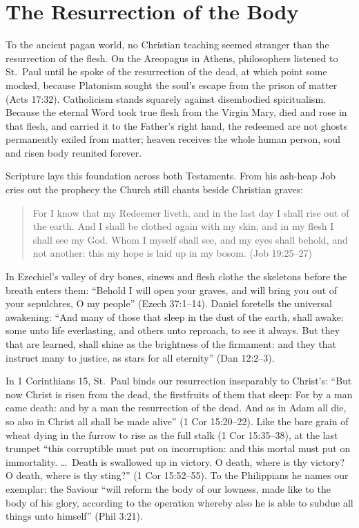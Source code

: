 \section{The Resurrection of the Body}

To the ancient pagan world, no Christian teaching seemed stranger than the resurrection of the flesh. On the Areopagus in Athens, philosophers listened to St.\ Paul until he spoke of the resurrection of the dead, at which point some mocked, because Platonism sought the soul's escape from the prison of matter (Acts 17:32). Catholicism stands squarely against disembodied spiritualism. Because the eternal Word took true flesh from the Virgin Mary, died and rose in that flesh, and carried it to the Father's right hand, the redeemed are not ghosts permanently exiled from matter; heaven receives the whole human person, soul and risen body reunited forever.

Scripture lays this foundation across both Testaments. From his ash-heap Job cries out the prophecy the Church still chants beside Christian graves:

\begin{quote}
For I know that my Redeemer liveth, and in the last day I shall rise out of the earth. And I shall be clothed again with my skin, and in my flesh I shall see my God. Whom I myself shall see, and my eyes shall behold, and not another: this my hope is laid up in my bosom. (Job 19:25--27)
\end{quote}

In Ezechiel's valley of dry bones, sinews and flesh clothe the skeletons before the breath enters them: ``Behold I will open your graves, and will bring you out of your sepulchres, O my people'' (Ezech 37:1--14). Daniel foretells the universal awakening: ``And many of those that sleep in the dust of the earth, shall awake: some unto life everlasting, and others unto reproach, to see it always. But they that are learned, shall shine as the brightness of the firmament: and they that instruct many to justice, as stars for all eternity'' (Dan 12:2--3).

In 1 Corinthians 15, St.\ Paul binds our resurrection inseparably to Christ's: ``But now Christ is risen from the dead, the firstfruits of them that sleep: For by a man came death: and by a man the resurrection of the dead. And as in Adam all die, so also in Christ all shall be made alive'' (1 Cor 15:20--22). Like the bare grain of wheat dying in the furrow to rise as the full stalk (1 Cor 15:35--38), at the last trumpet ``this corruptible must put on incorruption: and this mortal must put on immortality. \dots\ Death is swallowed up in victory. O death, where is thy victory? O death, where is thy sting?'' (1 Cor 15:52--55). To the Philippians he names our exemplar: the Saviour ``will reform the body of our lowness, made like to the body of his glory, according to the operation whereby also he is able to subdue all things unto himself'' (Phil 3:21).

